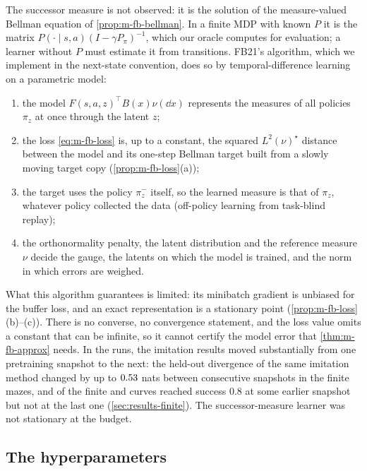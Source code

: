 The successor measure is not observed: it is the solution of the measure-valued Bellman equation of \cref{prop:m-fb-bellman}.
In a finite MDP with known $P$ it is the matrix $P(\cdot\mid s,a)(I-\gamma P_\pi)^{-1}$, which our oracle computes for evaluation; a learner without $P$ must estimate it from transitions.
FB21's algorithm, which we implement in the next-state convention, does so by temporal-difference learning on a parametric model:
\begin{enumerate}[nosep,label=(\roman*)]
\item the model $F(s,a,z)^\top B(x)\nu(\dd x)$ represents the measures of all policies $\pi_z$ at once through the latent $z$;
\item the loss \eqref{eq:m-fb-loss} is, up to a constant, the squared $L^2(\nu)^\star$ distance between the model and its one-step Bellman target built from a slowly moving target copy (\cref{prop:m-fb-loss}(a));
\item the target uses the policy $\pi^-_z$ itself, so the learned measure is that of $\pi_z$, whatever policy collected the data (off-policy learning from task-blind replay);
\item the orthonormality penalty, the latent distribution and the reference measure $\nu$ decide the gauge, the latents on which the model is trained, and the norm in which errors are weighed.
\end{enumerate}
What this algorithm guarantees is limited: its minibatch gradient is unbiased for the buffer loss, and an exact representation is a stationary point (\cref{prop:m-fb-loss}(b)--(c)). There is no converse, no convergence statement, and the loss value omits a constant that can be infinite, so it cannot certify the model error that \cref{thm:m-fb-approx} needs.
In the runs, the imitation results moved substantially from one pretraining snapshot to the next: the held-out divergence of the same imitation method changed by up to $\vn{s09.swing}{0.53}$ nats between consecutive snapshots in the finite mazes, and  of the  finite \ERFB{} and \DMFB{} curves reached success $0.8$ at some earlier snapshot but not at the last one (\cref{sec:results-finite}). The successor-measure learner was not stationary at the budget.

\subsection{The \texorpdfstring{\DMFB}{DM-FB} hyperparameters}

